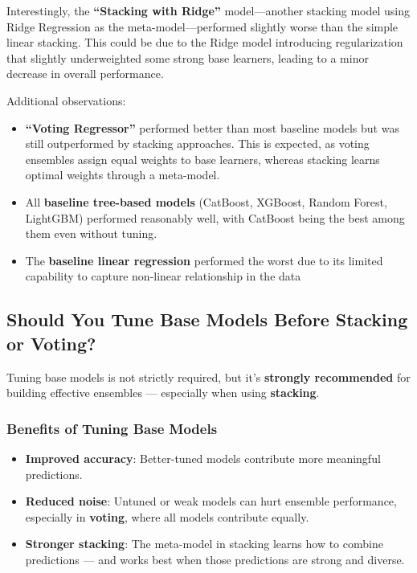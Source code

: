 \documentclass[
  letterpaper,
  DIV=11,
  numbers=noendperiod]{scrreprt}
\providecommand{\tightlist}{%
  \setlength{\itemsep}{0pt}\setlength{\parskip}{0pt}}\usepackage{longtable,booktabs,array}
\begin{document}
Interestingly, the \textbf{``Stacking with Ridge''} model---another
stacking model using Ridge Regression as the meta-model---performed
slightly worse than the simple linear stacking. This could be due to the
Ridge model introducing regularization that slightly underweighted some
strong base learners, leading to a minor decrease in overall
performance.

Additional observations:

\begin{itemize}
\tightlist
\item
  \textbf{``Voting Regressor''} performed better than most baseline
  models but was still outperformed by stacking approaches. This is
  expected, as voting ensembles assign equal weights to base learners,
  whereas stacking learns optimal weights through a meta-model.
\item
  All \textbf{baseline tree-based models} (CatBoost, XGBoost, Random
  Forest, LightGBM) performed reasonably well, with CatBoost being the
  best among them even without tuning.
\item
  The \textbf{baseline linear regression} performed the worst due to its
  limited capability to capture non-linear relationship in the data
\end{itemize}

\subsection{Should You Tune Base Models Before Stacking or
Voting?}\label{should-you-tune-base-models-before-stacking-or-voting}

Tuning base models is not strictly required, but it's \textbf{strongly
recommended} for building effective ensembles --- especially when using
\textbf{stacking}.

\subsubsection{Benefits of Tuning Base
Models}\label{benefits-of-tuning-base-models}

\begin{itemize}
\tightlist
\item
  \textbf{Improved accuracy}: Better-tuned models contribute more
  meaningful predictions.
\item
  \textbf{Reduced noise}: Untuned or weak models can hurt ensemble
  performance, especially in \textbf{voting}, where all models
  contribute equally.
\item
  \textbf{Stronger stacking}: The meta-model in stacking learns how to
  combine predictions --- and works best when those predictions are
  strong and diverse.
\end{itemize}
\end{document}
